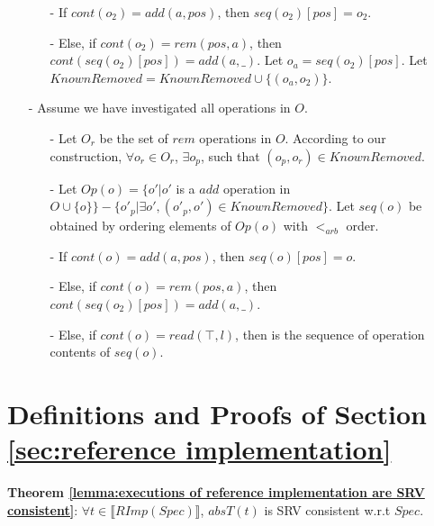 \begin{itemize}
\begin{itemize}
    \item[-] If $cont(o_2) = add(a,pos)$, then $seq(o_2)[pos] = o_2$.

    \item[-] Else, if $cont(o_2) = rem(pos,a)$, then $cont(seq(o_2)[pos])=add(a,\_)$. Let $o_a=seq(o_2)[pos]$. Let $KnownRemoved = KnownRemoved \cup \{ (o_a,o_2) \}$.
    \end{itemize}

\item[-] Assume we have investigated all operations in $O$.

    \begin{itemize}
    \setlength{\itemsep}{0.5pt}
    \item[-] Let $O_r$ be the set of $rem$ operations in $O$. According to our construction, $\forall o_r \in O_r$, $\exists o_p$, such that $(o_p,o_r) \in KnownRemoved$.

    \item[-] Let $Op(o) = \{ o' \vert o'$ is a $add$ operation in $O \cup \{ o \} \} - \{ o'_p \vert \exists o', (o'_p,o') \in KnownRemoved \}$. Let $seq(o)$ be obtained by ordering elements of $Op(o)$ with $<_{\textit{arb}}$ order.

    \item[-] If $cont(o) = add(a,pos)$, then $seq(o)[pos] = o$.

    \item[-] Else, if $cont(o) = rem(pos,a)$, then $cont(seq(o_2)[pos])=add(a,\_)$.

    \item[-] Else, if $cont(o)=read(\top,l)$, then is the sequence of operation contents of $seq(o)$.
    \end{itemize}
\end{itemize}














\section{Definitions and Proofs of Section \ref{sec:reference implementation}}
\label{sec:appendix definitions and proofs of section reference implementation}



{\noindent \bf Theorem \ref{lemma:executions of reference implementation are SRV consistent}}: $\forall t \in \llbracket RImp(Spec) \rrbracket$, $absT(t)$ is SRV consistent w.r.t $Spec$.

